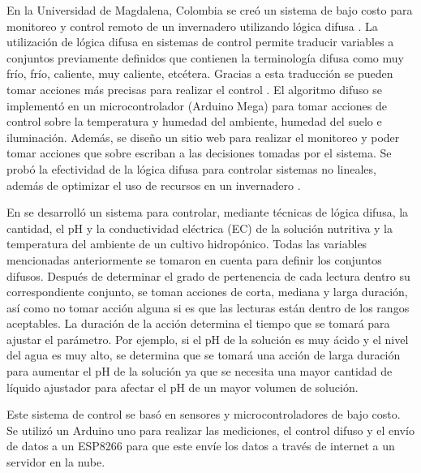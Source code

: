 En la Universidad de Magdalena, Colombia se creó un sistema de bajo costo para monitoreo y control remoto de un invernadero utilizando lógica difusa \cite{low_cost_fuzzy_logic_greenhouse}. La utilización de lógica difusa en sistemas de control permite traducir variables a conjuntos previamente definidos que contienen la terminología difusa como muy frío, frío, caliente, muy caliente, etcétera. Gracias a esta traducción se pueden tomar acciones más precisas para realizar el control \cite{agriculture_automation_review}. El algoritmo difuso se implementó en un microcontrolador (Arduino Mega) para tomar acciones de control sobre la temperatura y humedad del ambiente, humedad del suelo e iluminación. Además, se diseño un sitio web para realizar el monitoreo y poder tomar acciones que sobre escriban a las decisiones tomadas por el sistema. Se probó la efectividad de la lógica difusa para controlar sistemas no lineales, además de optimizar el uso de recursos en un 
invernadero \cite{low_cost_fuzzy_logic_greenhouse}.

En \cite{fuzzy_logic_controller} se desarrolló un sistema para controlar, mediante técnicas de lógica difusa, la cantidad, el pH y la conductividad eléctrica (EC) de la solución nutritiva y la temperatura del ambiente de un cultivo hidropónico. Todas las variables mencionadas anteriormente se tomaron en cuenta para definir los conjuntos difusos. Después de determinar el grado de pertenencia de cada lectura dentro su correspondiente conjunto, se toman acciones de corta, mediana y larga duración, así como no tomar acción alguna si es que las lecturas están dentro de los rangos aceptables. La duración de la acción determina el tiempo que se tomará para ajustar el parámetro. Por ejemplo, si el pH de la solución es muy ácido y el nivel del agua es muy alto, se determina que se tomará una acción de larga duración para aumentar el pH de la solución ya que se necesita una mayor cantidad de líquido ajustador para afectar el pH de un mayor volumen de solución. 

Este sistema de control \cite{fuzzy_logic_controller} se basó en sensores y microcontroladores de bajo costo. Se utilizó un Arduino uno para realizar las mediciones, el control difuso y el envío de datos a un ESP8266 para que este envíe los datos a través de internet a un servidor en la nube.

